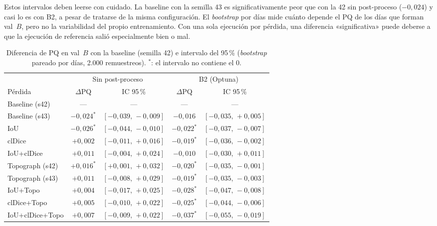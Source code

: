 Estos intervalos deben leerse con cuidado. La baseline con la semilla 43
es significativamente peor que con la 42 sin post-proceso
($-0{,}024$) y casi lo es con B2, a pesar de tratarse de la misma
configuración. El \emph{bootstrap} por días mide cuánto depende el PQ de
los días que forman val~$B$, pero no la variabilidad del propio
entrenamiento. Con una sola ejecución por pérdida, una diferencia
«significativa» puede deberse a que la ejecución de referencia salió
especialmente bien o mal.

\begin{table}[htbp]
\centering
\small
\begin{tabular}{@{}lcccc@{}}
\toprule
 & \multicolumn{2}{c}{Sin post-proceso} & \multicolumn{2}{c}{B2 (Optuna)}\\
\cmidrule(lr){2-3}\cmidrule(lr){4-5}
Pérdida & $\Delta$PQ & IC 95\,\% & $\Delta$PQ & IC 95\,\%\\
\midrule
Baseline (s42) & --- & --- & --- & --- \\
Baseline (s43) & $-0{,}024^*$ & $[-0{,}039,\,-0{,}009]$ & $-0{,}016$ & $[-0{,}035,\,+0{,}005]$ \\
IoU & $-0{,}026^*$ & $[-0{,}044,\,-0{,}010]$ & $-0{,}022^*$ & $[-0{,}037,\,-0{,}007]$ \\
clDice & $+0{,}002$ & $[-0{,}011,\,+0{,}016]$ & $-0{,}019^*$ & $[-0{,}036,\,-0{,}002]$ \\
IoU+clDice & $+0{,}011$ & $[-0{,}004,\,+0{,}024]$ & $-0{,}010$ & $[-0{,}030,\,+0{,}011]$ \\
Topograph (s42) & $+0{,}016^*$ & $[+0{,}001,\,+0{,}032]$ & $-0{,}020^*$ & $[-0{,}035,\,-0{,}001]$ \\
Topograph (s43) & $+0{,}011$ & $[-0{,}008,\,+0{,}029]$ & $-0{,}019^*$ & $[-0{,}035,\,-0{,}003]$ \\
IoU+Topo & $+0{,}004$ & $[-0{,}017,\,+0{,}025]$ & $-0{,}028^*$ & $[-0{,}047,\,-0{,}008]$ \\
clDice+Topo & $+0{,}005$ & $[-0{,}010,\,+0{,}022]$ & $-0{,}025^*$ & $[-0{,}044,\,-0{,}006]$ \\
IoU+clDice+Topo & $+0{,}007$ & $[-0{,}009,\,+0{,}022]$ & $-0{,}037^*$ & $[-0{,}055,\,-0{,}019]$ \\
\bottomrule
\end{tabular}
\caption{Diferencia de PQ en val~$B$ con la baseline (semilla 42) e
intervalo del 95\,\% (\emph{bootstrap} pareado por días, 2.000
remuestreos). $^*$: el intervalo no contiene el 0.}
\label{tab:res-bootstrap}
\end{table}


